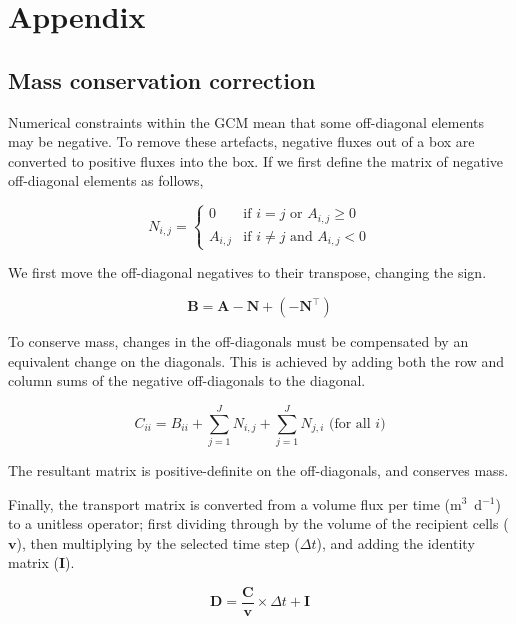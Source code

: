 \documentclass[12pt]{article}
\begin{document}
\clearpage 

\appendix

\section{Appendix}

\subsection{Mass conservation correction}

Numerical constraints within the GCM mean that some off-diagonal elements may be negative. To remove these artefacts, negative fluxes out of a box are converted to positive fluxes into the box. If we first define the matrix of negative off-diagonal elements as follows,

\begin{equation}
N_{i,j} = 
\begin{cases}
0 		& \text{if $i=j$ or $A_{i,j}\ge 0$}\\
A_{i,j} 	& \text{if $i\ne j$ and $A_{i,j}<0 $}
\end{cases}
\end{equation}

We first move the off-diagonal negatives to their transpose, changing the sign.

\begin{equation}
\mathbf{B} = \mathbf{A} - \mathbf{N} + ( - \mathbf{N}^\top)
\end{equation}

To conserve mass, changes in the off-diagonals must be compensated by an equivalent change on the diagonals. This is achieved by adding both the row and column sums of the negative off-diagonals to the diagonal. 

\begin{equation}
C_{i i} = B_{i i} + \sum_{j=1}^J N_{i,j} + \sum_{j=1}^J N_{j,i} \text{ (for all $i$)}
\end{equation}

The resultant matrix is positive-definite on the off-diagonals, and conserves mass.

Finally, the transport matrix is converted from a volume flux per time (m$^3$~d$^{-1}$) to a unitless operator; first dividing through by the volume of the recipient cells ($\mathbf{v}$), then multiplying by the selected time step ($\Delta t$), and adding the identity matrix ($\mathbf{I}$).

\begin{equation}
\mathbf{D} = \frac{\mathbf{C}}{\mathbf{v}} \times \Delta t + \mathbf{I}
\end{equation}
\end{document}
